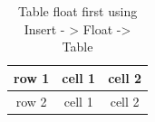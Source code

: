 \begin{table}
\begin{tabular}{|c|c|c|}
\hline 
row 1 & cell 1 & cell 2\tabularnewline
\hline 
\hline 
row 2 & cell 1 & cell 2\tabularnewline
\hline 
\end{tabular}

\caption{Table float first using Insert - > Float -> Table}


\end{table}


